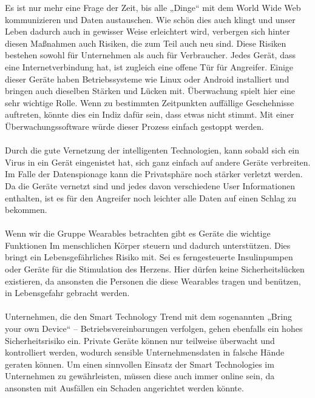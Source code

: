 \documentclass{report}
\begin{document}
Es ist nur mehr eine Frage der Zeit, bis alle „Dinge“ mit dem World Wide Web kommunizieren und Daten austauschen. Wie schön dies auch klingt und unser Leben dadurch auch in gewisser Weise erleichtert wird, verbergen sich hinter diesen Maßnahmen auch Risiken, die zum Teil auch neu sind. Diese Risiken bestehen sowohl für Unternehmen als auch für Verbraucher. Jedes Gerät, dass eine Internetverbindung hat, ist zugleich eine offene Tür für Angreifer. Einige dieser Geräte haben Betriebssysteme wie Linux oder Android installiert und bringen auch dieselben Stärken und Lücken mit.
Überwachung spielt hier eine sehr wichtige Rolle. Wenn zu bestimmten Zeitpunkten auffällige Geschehnisse auftreten, könnte dies ein Indiz dafür sein, dass etwas nicht stimmt. Mit einer Überwachungssoftware würde dieser Prozess einfach gestoppt werden. 
\\
\\
Durch die gute Vernetzung der intelligenten Technologien, kann sobald sich ein Virus in ein Gerät eingenistet hat, sich ganz einfach auf andere Geräte verbreiten. Im Falle der Datenspionage kann die Privatsphäre noch stärker verletzt werden. Da die Geräte vernetzt sind und jedes davon verschiedene User Informationen enthalten, ist es für den Angreifer noch leichter alle Daten auf einen Schlag zu bekommen.
\\
\\
Wenn wir die Gruppe Wearables betrachten gibt es Geräte die wichtige Funktionen Im menschlichen Körper steuern und dadurch unterstützen. Dies bringt ein Lebensgefährliches Risiko mit. Sei es ferngesteuerte Insulinpumpen oder Geräte für die Stimulation des Herzens. Hier dürfen keine Sicherheitslücken existieren, da ansonsten die Personen die diese Wearables tragen und benützen, in Lebensgefahr gebracht werden.
\\
\\
Unternehmen, die den Smart Technology Trend mit dem sogenannten „Bring your own Device“ – Betriebsvereinbarungen verfolgen, gehen ebenfalls ein hohes Sicherheitsrisiko ein. Private Geräte können nur teilweise überwacht und kontrolliert werden, wodurch sensible Unternehmensdaten in falsche Hände geraten können. Um einen sinnvollen Einsatz der Smart Technologies im Unternehmen zu gewährleisten, müssen diese auch immer online sein, da ansonsten mit Ausfällen ein Schaden angerichtet werden könnte.
\\
\\
\end{document}
